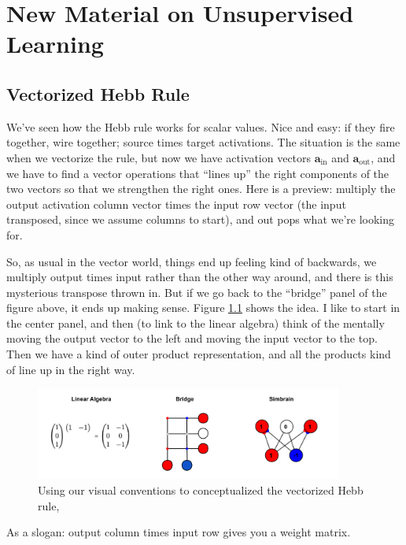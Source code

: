 \chapter{New Material on Unsupervised Learning}

\section{Vectorized Hebb Rule}

We've seen how the Hebb rule works for scalar values. Nice and easy: if they fire together, wire together; source times target activations. The situation is the same when we vectorize the rule, but now we have activation vectors $\mathbf{a}_{\text{in}}$ and $\mathbf{a}_{\text{out}}$, and we have to find a vector operations that ``lines up'' the right components of the two vectors so that we strengthen the right ones.  Here is a preview: multiply the output activation column vector times the input row vector (the input transposed, since we assume columns to start), and out pops what we're looking for. 

So, as usual in the vector world, things end up feeling kind of backwards, we multiply output times input rather than the other way around, and there is this mysterious transpose thrown in.  But if we go back to the ``bridge'' panel of the figure above, it ends up making sense. Figure \ref{vectorizedHebb} shows the idea. I like to start in the center panel, and then (to link to the linear algebra) think of the mentally moving the output vector to the left and moving the input vector to the top. Then we have a kind of outer product representation, and all the products kind of line up in the right way. 

\begin{figure}[h]
\centering
\includegraphics[width=0.9\textwidth]{images/vectorizedHebb.png}
\caption[Jeff Yoshimi.]{Using our visual conventions to conceptualized the vectorized Hebb rule,}
\label{vectorizedHebb}
\end{figure}

As a slogan: output column times input row gives you a weight matrix.

